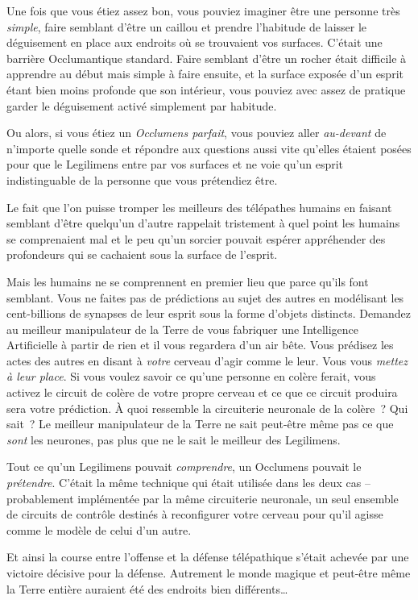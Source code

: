 Une fois que vous étiez assez bon, vous pouviez imaginer être une personne très \emph{simple}, faire semblant d'être un caillou et prendre l'habitude de laisser le déguisement en place aux endroits où se trouvaient vos surfaces.
C'était une barrière Occlumantique standard.
Faire semblant d'être un rocher était difficile à apprendre au début mais simple à faire ensuite, et la surface exposée d'un esprit étant bien moins profonde que son intérieur, vous pouviez avec assez de pratique garder le déguisement activé simplement par habitude.

Ou alors, si vous étiez un \emph{Occlumens parfait}, vous pouviez aller \emph{au-devant} de n'importe quelle sonde et répondre aux questions aussi vite qu'elles étaient posées pour que le Legilimens entre par vos surfaces et ne voie qu'un esprit indistinguable de la personne que vous prétendiez être.

Le fait que l'on puisse tromper les meilleurs des télépathes humains en faisant semblant d'être quelqu'un d'autre rappelait tristement à quel point les humains se comprenaient mal et le peu qu'un sorcier pouvait espérer appréhender des profondeurs qui se cachaient sous la surface de l'esprit.

Mais les humains ne se comprennent en premier lieu que parce qu'ils font semblant.
Vous ne faites pas de prédictions au sujet des autres en modélisant les cent-billions de synapses de leur esprit sous la forme d'objets distincts.
Demandez au meilleur manipulateur de la Terre de vous fabriquer une Intelligence Artificielle à partir de rien et il vous regardera d'un air bête.
Vous prédisez les actes des autres en disant à \emph{votre} cerveau d'agir comme le leur.
Vous vous \emph{mettez à leur place}.
Si vous voulez savoir ce qu'une personne en colère ferait, vous activez le circuit de colère de votre propre cerveau et ce que ce circuit produira sera votre prédiction.
À quoi ressemble la circuiterie neuronale de la colère~?
Qui sait~?
Le meilleur manipulateur de la Terre ne sait peut-être même pas ce que \emph{sont} les neurones, pas plus que ne le sait le meilleur des Legilimens.

Tout ce qu'un Legilimens pouvait \emph{comprendre}, un Occlumens pouvait le \emph{prétendre}.
C'était la même technique qui était utilisée dans les deux cas -- probablement implémentée par la même circuiterie neuronale, un seul ensemble de circuits de contrôle destinés à reconfigurer votre cerveau pour qu'il agisse comme le modèle de celui d'un autre.

Et ainsi la course entre l'offense et la défense télépathique s'était achevée par une victoire décisive pour la défense.
Autrement le monde magique et peut-être même la Terre entière auraient été des endroits bien différents…


